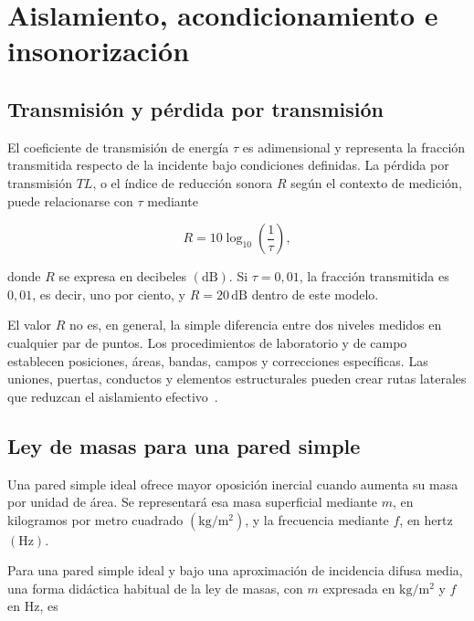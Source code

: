 \section{Aislamiento, acondicionamiento e insonorización}
\label{sec:u9-aislamiento}

\subsection{Transmisión y pérdida por transmisión}
\label{sec:u9-perdida-transmision}

El coeficiente de transmisión de energía \(\tau\) es adimensional y representa
la fracción transmitida respecto de la incidente bajo condiciones definidas.
La pérdida por transmisión \(TL\), o el índice de reducción sonora
\(R\) según el contexto de medición, puede relacionarse con \(\tau\) mediante~\cite{fahyGardonio2007,iso10140_2_2021}

\begin{equation}
    R=10\log_{10}\!\left(\frac{1}{\tau}\right),
    \label{eq:u9-reduccion-transmision}
\end{equation}

donde \(R\) se expresa en decibeles \((\text{dB})\). Si
\(\tau=0{,}01\), la fracción transmitida es \(0{,}01\), es decir, uno por
ciento, y
\(R=20\,\text{dB}\) dentro de este modelo.

El valor \(R\) no es, en general, la simple diferencia entre dos niveles
medidos en cualquier par de puntos. Los procedimientos de laboratorio
y de campo establecen posiciones, áreas, bandas, campos y correcciones
específicas. Las uniones, puertas, conductos y elementos estructurales pueden
crear rutas laterales que reduzcan el aislamiento efectivo~\cite{fahyGardonio2007,iso10140_2_2021}.

\subsection{Ley de masas para una pared simple}
\label{sec:u9-ley-masas}

Una pared simple ideal ofrece mayor oposición inercial cuando aumenta su masa
por unidad de área. Se representará esa masa superficial mediante \(m\), en
kilogramos por metro cuadrado \((\text{kg}/\text{m}^2)\), y la frecuencia
mediante \(f\), en hertz \((\text{Hz})\).

Para una pared simple ideal y bajo una aproximación de incidencia difusa media, una forma didáctica habitual de la ley de masas, con \(m\) expresada en \(\text{kg}/\text{m}^2\) y \(f\) en \(\text{Hz}\), es~\cite{fahyGardonio2007}

